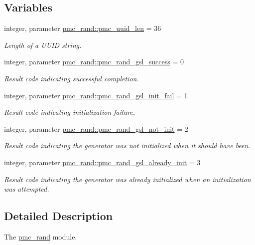 \subsection*{Variables}
\begin{DoxyCompactItemize}
\item 
integer, parameter \mbox{\hyperlink{namespacepmc__rand_a50eda03f05afa1016ef7c63910f62abf}{pmc\+\_\+rand\+::pmc\+\_\+uuid\+\_\+len}} = 36
\begin{DoxyCompactList}\small\item\em Length of a U\+U\+ID string. \end{DoxyCompactList}\item 
integer, parameter \mbox{\hyperlink{namespacepmc__rand_ae92b9bb82c9825f509a7833ba419477b}{pmc\+\_\+rand\+::pmc\+\_\+rand\+\_\+gsl\+\_\+success}} = 0
\begin{DoxyCompactList}\small\item\em Result code indicating successful completion. \end{DoxyCompactList}\item 
integer, parameter \mbox{\hyperlink{namespacepmc__rand_a61fd879b01560eb3c93b8e8548469c03}{pmc\+\_\+rand\+::pmc\+\_\+rand\+\_\+gsl\+\_\+init\+\_\+fail}} = 1
\begin{DoxyCompactList}\small\item\em Result code indicating initialization failure. \end{DoxyCompactList}\item 
integer, parameter \mbox{\hyperlink{namespacepmc__rand_aac2309eecd307a2b026d521d5dfdb58c}{pmc\+\_\+rand\+::pmc\+\_\+rand\+\_\+gsl\+\_\+not\+\_\+init}} = 2
\begin{DoxyCompactList}\small\item\em Result code indicating the generator was not initialized when it should have been. \end{DoxyCompactList}\item 
integer, parameter \mbox{\hyperlink{namespacepmc__rand_a527b1327bd44917b19920fb8427a04f6}{pmc\+\_\+rand\+::pmc\+\_\+rand\+\_\+gsl\+\_\+already\+\_\+init}} = 3
\begin{DoxyCompactList}\small\item\em Result code indicating the generator was already initialized when an initialization was attempted. \end{DoxyCompactList}\end{DoxyCompactItemize}


\subsection{Detailed Description}
The \mbox{\hyperlink{namespacepmc__rand}{pmc\+\_\+rand}} module. 

